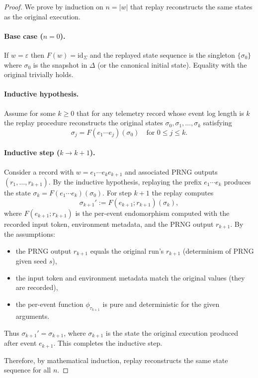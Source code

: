 \documentclass[11pt]{article}
\begin{document}
\begin{proof}
We prove by induction on $n=|w|$ that replay reconstructs the same states as the original execution.

\paragraph{Base case ($n=0$).}
If $w=\varepsilon$ then $F(w)=\mathrm{id}_\Sigma$ and the replayed state sequence is the singleton $\{\sigma_0\}$ where $\sigma_0$ is the snapshot in $\Delta$ (or the canonical initial state). Equality with the original trivially holds.

\paragraph{Inductive hypothesis.}
Assume for some $k\ge 0$ that for any telemetry record whose event log length is $k$ the replay procedure reconstructs the original states $\sigma_0,\sigma_1,\dots,\sigma_k$ satisfying
\[
\sigma_j = F(e_1\cdots e_j)(\sigma_0)\quad\text{for }0\le j\le k.
\]

\paragraph{Inductive step ($k\to k+1$).}
Consider a record with $w=e_1\cdots e_k e_{k+1}$ and associated PRNG outputs $(r_1,\dots,r_{k+1})$. By the inductive hypothesis, replaying the prefix $e_1\cdots e_k$ produces the state $\sigma_k = F(e_1\cdots e_k)(\sigma_0)$. For step $k+1$ the replay computes
\[
\sigma_{k+1}' := F(e_{k+1};r_{k+1})(\sigma_k),
\]
where $F(e_{k+1};r_{k+1})$ is the per-event endomorphism computed with the recorded input token, environment metadata, and the PRNG output $r_{k+1}$. By the assumptions:
\begin{itemize}
  \item the PRNG output $r_{k+1}$ equals the original run's $r_{k+1}$ (determinism of PRNG given seed $s$),
  \item the input token and environment metadata match the original values (they are recorded),
  \item the per-event function $\phi_{\tau_{k+1}}$ is pure and deterministic for the given arguments.
\end{itemize}
Thus $\sigma_{k+1}'=\sigma_{k+1}$, where $\sigma_{k+1}$ is the state the original execution produced after event $e_{k+1}$. This completes the inductive step.

Therefore, by mathematical induction, replay reconstructs the same state sequence for all $n$.
\end{proof}
\end{document}

